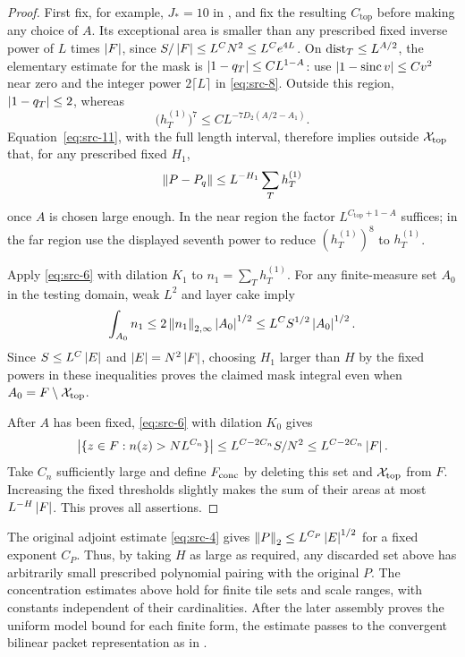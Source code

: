 \begin{proof}
First fix, for example, $J_*=10$ in , and fix
the resulting $C_{\mathrm{top}}$ before making any choice of $A$.
Its exceptional area is smaller than any prescribed fixed inverse
power of $L$ times $\left|F\right|$, since
$S/\left|F\right|\leq L^C N^2\leq L^C e^{4L}$.
On $\operatorname{dist}_T\leq L^{A/2}$, the elementary estimate for the mask is
$\left|1-q_T\right|\leq C L^{1-A}$: use
$\left|1-\operatorname{sinc}v\right|\leq Cv^2$ near zero and the integer
power $2\lceil L\rceil$ in \eqref{eq:src-8}.
Outside this region, $\left|1-q_T\right|\leq2$, whereas
\[
 \big(h_T^{(1)}\big)^7
 \leq C L^{-7D_2(A/2-A_1)}.
\]
Equation~\eqref{eq:src-11}, with the full length interval, therefore
implies outside $\mathcal X_{\rm top}$ that, for any prescribed fixed
$H_1$,
\begin{equation}\label{conc:mask-pointwise}
 \left\|P-P_q\right\|\leq L^{-H_1}\sum_T h_T^{(1)}
\end{equation}
once $A$ is chosen large enough.  In the near region the factor
$L^{C_{\mathrm{top}}+1-A}$ suffices; in the far region use the displayed
seventh power to reduce $(h_T^{(1)})^8$ to $h_T^{(1)}$.

Apply \eqref{eq:src-6} with dilation $K_1$ to
$n_1=\sum_Th_T^{(1)}$.  For any finite-measure set $A_0$ in the testing
domain, weak $L^2$ and layer cake imply
\[
 \int_{A_0}n_1\leq2\left\|n_1\right\|_{2,\infty}\left|A_0\right|^{1/2}
 \leq L^C S^{1/2}\left|A_0\right|^{1/2}.
\]
Since $S\leq L^C\left|E\right|$ and $\left|E\right|=N^2\left|F\right|$, choosing $H_1$
larger than $H$ by the fixed powers in these inequalities proves the
claimed mask integral even when $A_0=F\setminus\mathcal X_{\rm top}$.

After $A$ has been fixed, \eqref{eq:src-6} with dilation $K_0$ gives
\[
 \left|\{z\in F:n(z)>NL^{C_n}\}\right|
 \leq L^{C-2C_n} S/N^2
 \leq L^{C-2C_n}\left|F\right|.
\]
Take $C_n$ sufficiently large and define $F_{\rm conc}$ by deleting
this set and $\mathcal X_{\rm top}$ from $F$.  Increasing the fixed
thresholds slightly makes the sum of their areas at most
$L^{-H}\left|F\right|$.  This proves all assertions.
\end{proof}

The original adjoint estimate \eqref{eq:src-4} gives
$\left\|P\right\|_2\leq L^{C_P}\left|E\right|^{1/2}$ for a fixed exponent $C_P$.
Thus, by taking $H$ as large as required, any discarded set above has
arbitrarily small prescribed polynomial pairing with the original
$P$.  The concentration estimates above hold for finite tile sets and
scale ranges, with constants independent of their cardinalities.  After
the later assembly proves the uniform model bound for each finite form,
the estimate passes to the convergent bilinear packet representation as
in .
